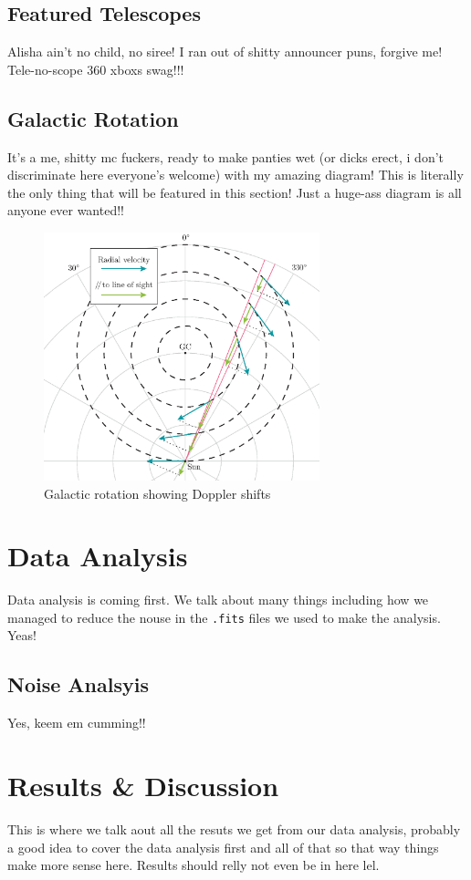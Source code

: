\documentclass[a4paper, titlepage, oneside]{article}
\begin{document}
\begin{multicols}{2}
\subsection{Featured Telescopes}
Alisha ain't no child, no siree! I ran out of shitty announcer puns, forgive me! Tele-no-scope 360 xboxs swag!!!

\subsection{Galactic Rotation}
It's a me, shitty mc fuckers, ready to make panties wet (or dicks erect, i don't discriminate here everyone's welcome) with my amazing diagram! This is literally the only thing that will be featured in this section! Just a huge-ass diagram is all anyone ever wanted!!

\begin{figure}[H]
\centering
\includegraphics[width=8cm]{figures/galactic-rotation}
\caption{Galactic rotation showing Doppler shifts}
\label{fig:gal-rot}
\end{figure}

\section{Data Analysis}
Data analysis is coming first. We talk about many things including how we managed to reduce the nouse in the \texttt{.fits} files we used to make the analysis. Yeas!

\subsection{Noise Analsyis}
Yes, keem em cumming!!

\section{Results \& Discussion}
This is where we talk aout all the resuts we get from our data analysis, probably a good idea to cover the data analysis first and all of that so that way things make more sense here. Results should relly not even be in here lel.


\end{multicols}
\end{document}
